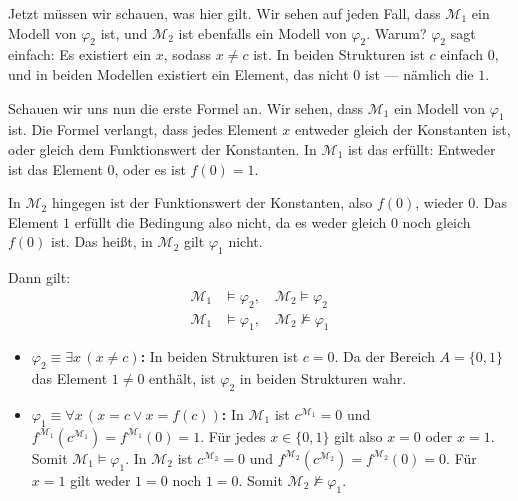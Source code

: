 \begin{spoken-clean}[01:12:33 - 01:14:03]
Jetzt müssen wir schauen, was hier gilt. Wir sehen auf jeden Fall, dass $\mathcal{M}_1$ ein Modell von $\varphi_2$ ist, und $\mathcal{M}_2$ ist ebenfalls ein Modell von $\varphi_2$. Warum? $\varphi_2$ sagt einfach: Es existiert ein $x$, sodass $x \neq c$ ist. In beiden Strukturen ist $c$ einfach $0$, und in beiden Modellen existiert ein Element, das nicht $0$ ist --- nämlich die $1$.

Schauen wir uns nun die erste Formel an. Wir sehen, dass $\mathcal{M}_1$ ein Modell von $\varphi_1$ ist. Die Formel verlangt, dass jedes Element $x$ entweder gleich der Konstanten ist, oder gleich dem Funktionswert der Konstanten. In $\mathcal{M}_1$ ist das erfüllt: Entweder ist das Element $0$, oder es ist $f(0) = 1$.

In $\mathcal{M}_2$ hingegen ist der Funktionswert der Konstanten, also $f(0)$, wieder $0$. Das Element $1$ erfüllt die Bedingung also nicht, da es weder gleich $0$ noch gleich $f(0)$ ist. Das heißt, in $\mathcal{M}_2$ gilt $\varphi_1$ nicht.
\end{spoken-clean}

\begin{math-stroke}
Dann gilt:
\begin{align*}
\mathcal{M}_1 &\models \varphi_2, \quad \mathcal{M}_2 \models \varphi_2 \\
\mathcal{M}_1 &\models \varphi_1, \quad \mathcal{M}_2 \not\models \varphi_1
\end{align*}

\begin{explanation-of-steps}
\begin{itemize}
    \item \textbf{$\varphi_2 \equiv \exists x \, (x \neq c)$:} In beiden Strukturen ist $c = 0$. Da der Bereich $A = \{0, 1\}$ das Element $1 \neq 0$ enthält, ist $\varphi_2$ in beiden Strukturen wahr.
    \item \textbf{$\varphi_1 \equiv \forall x \, (x = c \lor x = f(c))$:} 
    In $\mathcal{M}_1$ ist $c^{\mathcal{M}_1} = 0$ und $f^{\mathcal{M}_1}(c^{\mathcal{M}_1}) = f^{\mathcal{M}_1}(0) = 1$. Für jedes $x \in \{0, 1\}$ gilt also $x = 0$ oder $x = 1$. Somit $\mathcal{M}_1 \models \varphi_1$.
    In $\mathcal{M}_2$ ist $c^{\mathcal{M}_2} = 0$ und $f^{\mathcal{M}_2}(c^{\mathcal{M}_2}) = f^{\mathcal{M}_2}(0) = 0$. Für $x = 1$ gilt weder $1 = 0$ noch $1 = 0$. Somit $\mathcal{M}_2 \not\models \varphi_1$.
\end{itemize}
\end{explanation-of-steps}
\end{math-stroke}

